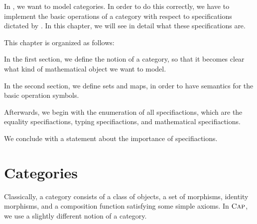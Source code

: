 In \CapPkg, we want to model categories.
In order to do this correctly, we have to implement the basic operations
of a category with respect to specifications dictated by \CapPkg.
In this chapter, we will see in detail what these specifications are.

This chapter is organized as follows:

In the first section, we define the notion of a category, so that it becomes
clear what kind of mathematical object we want to model.

In the second section, we define \GAP sets and \GAP maps, in order to have semantics
for the basic operation symbols.

Afterwards, we begin with the enumeration of all specifiactions, which are
the equality specifiactions, typing specifiactions, and mathematical specifiactions.

We conclude with a statement about the importance of specifiactions.

\section{Categories}\label{section:categories}

Classically, a category consists of a class of objects, a set of morphisms, identity morphisms, and a composition function
satisfying some simple axioms. In $\textsc{Cap}$, we use a slightly different notion of a category.

